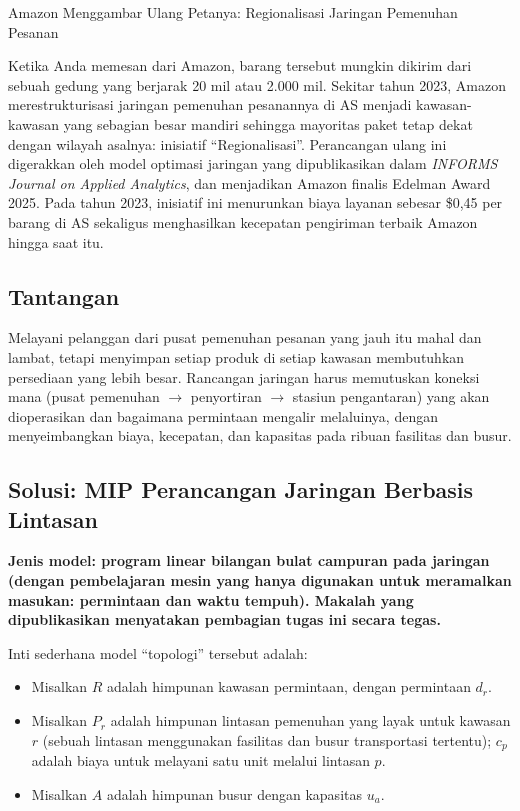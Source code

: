 \begin{casestudybox}{Amazon Menggambar Ulang Petanya: Regionalisasi Jaringan Pemenuhan Pesanan}
\label{case:amazon-regionalization}

Ketika Anda memesan dari Amazon, barang tersebut mungkin dikirim dari sebuah gedung yang berjarak 20 mil atau 2.000 mil. Sekitar tahun 2023, Amazon merestrukturisasi jaringan pemenuhan pesanannya di AS menjadi kawasan-kawasan yang sebagian besar mandiri sehingga mayoritas paket tetap dekat dengan wilayah asalnya: inisiatif ``Regionalisasi''. Perancangan ulang ini digerakkan oleh model optimasi jaringan yang dipublikasikan dalam \emph{INFORMS Journal on Applied Analytics}, dan menjadikan Amazon finalis Edelman Award 2025. Pada tahun 2023, inisiatif ini menurunkan biaya layanan sebesar \$0,45 per barang di AS sekaligus menghasilkan kecepatan pengiriman terbaik Amazon hingga saat itu.

\subsection*{Tantangan}
Melayani pelanggan dari pusat pemenuhan pesanan yang jauh itu mahal dan lambat, tetapi menyimpan setiap produk di setiap kawasan membutuhkan persediaan yang lebih besar. Rancangan jaringan harus memutuskan koneksi mana (pusat pemenuhan $\to$ penyortiran $\to$ stasiun pengantaran) yang akan dioperasikan dan bagaimana permintaan mengalir melaluinya, dengan menyeimbangkan biaya, kecepatan, dan kapasitas pada ribuan fasilitas dan busur.

\subsection*{Solusi: MIP Perancangan Jaringan Berbasis Lintasan}
\textbf{Jenis model: program linear bilangan bulat campuran pada jaringan (dengan pembelajaran mesin yang hanya digunakan untuk meramalkan masukan: permintaan dan waktu tempuh). Makalah yang dipublikasikan menyatakan pembagian tugas ini secara tegas.}

Inti sederhana model ``topologi'' tersebut adalah:

\begin{itemize}
\item Misalkan $R$ adalah himpunan kawasan permintaan, dengan permintaan $d_r$.
\item Misalkan $P_r$ adalah himpunan lintasan pemenuhan yang layak untuk kawasan $r$ (sebuah lintasan menggunakan fasilitas dan busur transportasi tertentu); $c_p$ adalah biaya untuk melayani satu unit melalui lintasan $p$.
\item Misalkan $A$ adalah himpunan busur dengan kapasitas $u_a$.
\end{itemize}


\end{casestudybox}
